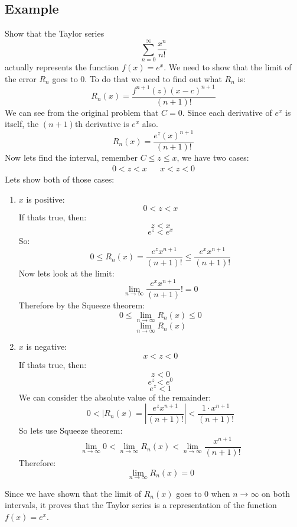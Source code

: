 \documentclass{report}
\begin{document}
    \subsection{Example}
        Show that the Taylor series
        \[\sum_{n=0}^{\infty} \frac{x^n}{n!}\]
        actually represents the function \(f(x) = e^x\).
        We need to show that the limit of the error \(R_n\) goes to \(0\).
        To do that we need to find out what \(R_n\) is:
        \[R_n(x) = \frac{f^{n+1}(z)(x-c)^{n+1}}{(n+1)!}\]
        We can see from the original problem that \(C = 0\).
        Since each derivative of \(e^x\) is itself, the \((n+1)\)th derivative is \(e^x\) also.
        \[R_n(x) = \frac{e^z (x)^{n+1}}{(n+1)!}\]
        Now lets find the interval, remember \(C \leq z \leq x\), we have two cases:
        \begin{align*}
            0 < z < x && x < z < 0
        \end{align*}
        Lets show both of those cases:
        \begin{enumerate}
            \item \(x\) is positive:
            \[0 < z < x\]
            If thats true, then:
            \[z < x\]
            \[e^z < e^x\]
            So:
            \[0 \leq R_n(x) = \frac{e^z x^{n+1}}{(n+1)!} \leq \frac{e^x x^{n+1}}{(n+1)!}\]
            Now lets look at the limit:
            \[\lim_{n \to \infty} \frac{e^x x^{n+1}}{(n+1)}! = 0\]
            Therefore by the Squeeze theorem:
            \[0 \leq \lim_{n \to \infty} R_n(x) \leq 0\]
            \[\lim_{n \to \infty} R_n(x)\]
            \item \(x\) is negative:
            \[x < z < 0\]
            If thats true, then:
            \[z < 0\]
            \[e^z < e^0\]
            \[e^z < 1\]
            We can consider the absolute value of the remainder:
            \[0 < |R_n(x) = \left| \frac{e^z x^{n+1}}{(n+1)!} \right| < \frac{1 \cdot x^{n+1}}{(n+1)!}\]
            So lets use Squeeze theorem:
            \[\lim_{n \to \infty} 0 < \lim_{n \to \infty} R_n(x) < \lim_{n \to \infty} \frac{x^{n+1}}{(n+1)!}\]
            Therefore:
            \[\lim_{n \to \infty} R_n(x) = 0\]
        \end{enumerate}
        Since we have shown that the limit of \(R_n(x)\) goes to \(0\) when \(n \to \infty\) on both intervals, it proves that the Taylor series
        is a representation of the function \(f(x) = e^x\).
    
\end{document}
